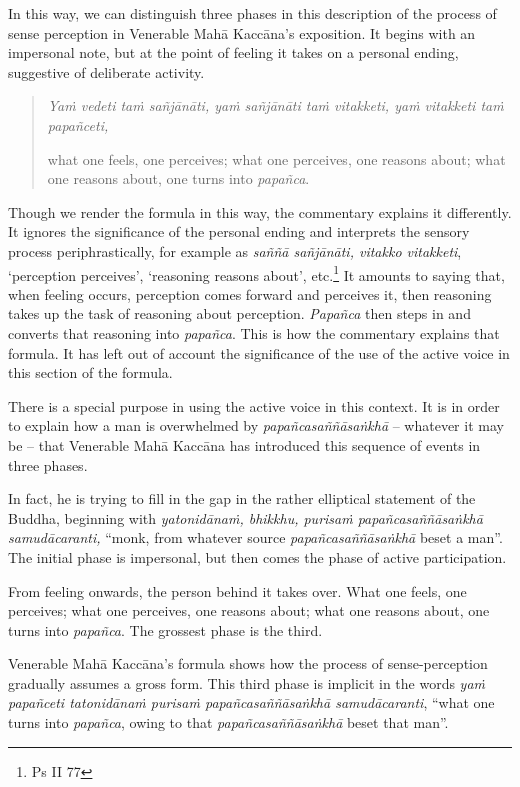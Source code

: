 In this way, we can distinguish three phases in this description of the process of sense perception in Venerable Mahā Kaccāna's exposition. It begins with an impersonal note, but at the point of feeling it takes on a personal ending, suggestive of deliberate activity.

\begin{quote}
\emph{Yaṁ vedeti taṁ sañjānāti, yaṁ sañjānāti taṁ vitakketi, yaṁ vitakketi taṁ papañceti,}

what one feels, one perceives; what one perceives, one reasons about; what one reasons about, one turns into \emph{papañca}.
\end{quote}

Though we render the formula in this way, the commentary explains it differently. It ignores the significance of the personal ending and interprets the sensory process periphrastically, for example as \emph{saññā sañjānāti, vitakko vitakketi}, `perception perceives', `reasoning reasons about', etc.\footnote{Ps II 77} It amounts to saying that, when feeling occurs, perception comes forward and perceives it, then reasoning takes up the task of reasoning about perception. \emph{Papañca} then steps in and converts that reasoning into \emph{papañca}. This is how the commentary explains that formula. It has left out of account the significance of the use of the active voice in this section of the formula.

There is a special purpose in using the active voice in this context. It is in order to explain how a man is overwhelmed by \emph{papañcasaññāsaṅkhā} -- whatever it may be -- that Venerable Mahā Kaccāna has introduced this sequence of events in three phases.

In fact, he is trying to fill in the gap in the rather elliptical statement of the Buddha, beginning with \emph{yatonidānaṁ, bhikkhu, purisaṁ papañcasaññāsaṅkhā samudācaranti,} ``monk, from whatever source \emph{papañcasaññāsaṅkhā} beset a man''. The initial phase is impersonal, but then comes the phase of active participation.

From feeling onwards, the person behind it takes over. What one feels, one perceives; what one perceives, one reasons about; what one reasons about, one turns into \emph{papañca}. The grossest phase is the third.

Venerable Mahā Kaccāna's formula shows how the process of sense-perception gradually assumes a gross form. This third phase is implicit in the words \emph{yaṁ papañceti tatonidānaṁ purisaṁ papañcasaññāsaṅkhā samudācaranti}, ``what one turns into \emph{papañca}, owing to that \emph{papañcasaññāsaṅkhā} beset that man''.

